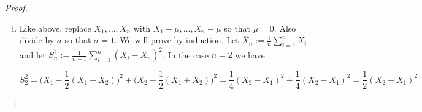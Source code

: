 \begin{proof}
\begin{enumerate}[(i)]
so 

\[
S^2 = \frac{1}{\sigma^2}  \left[  \frac{1}{\sqrt{2}} (X_1 - X_2) \right]^2  \sim \chi_1^2.
\]

\[
\frac{(n-1) S^2}{\sigma^2}  = \frac{1}{\sigma^2} \sum_{i=1}^n (X_i - \overline{X}_n)^2 = \frac{1}{\sigma^2} \sum_{i=1}^n \left( X_i - \overline{X}_n \right) ^2
\]

Next we will induct on \(n\). Some tedious algebra shows that 

\[
\frac{n S_{n+1}^2}{\sigma^2} = \frac{n-1}{\sigma^2} S_n^2 + \frac{1}{\sigma^2} \frac{n}{n+1} (X_{n+1} - \overline{X}_n)^2, \qquad \forall n \geq 2,
\]

where \(S_n^2\) is the sample variance for \(n\) independent Gaussian random variables. It can also be shown through simple algebra that

\[
\{  (X_{n+1} - \overline{X}_n) \} \sim \mathcal{N}(0, \sigma^2(n+1)/n),
\]

so

\[
\frac{1}{\sigma^2} \frac{n}{n+1} (X_{n+1} - \overline{X}_n)^2 \sim \chi_1^2.
\]

It can be shown by first principles (i.e., without Basu's Theorem) that \( \overline{X}_n \indep S_n^2\), and clearly \(X_{n+1} \indep S^2\). Therefore we have shown that if \((n-1) S_n^2 /\sigma^2 \sim \chi_{n-1}^2\), it follows that \(n S_{n+1}^2 /\sigma^2 \sim \chi_n^2\), concluding the proof that 

\[
\frac{(n-1) S^2}{\sigma^2} \sim \chi_{n-1}^2.
\]

To show that \(S^2\) is ancillary for \(\mu\), simply observe that 

\[
S^2 \sim  \frac{\sigma^2} {n-1} \chi_{n-1}^2;
\]

that is, the distribution of \(S^2\) depends only on \(n\) and \(\sigma^2\), not \(\mu\). Therefore by definition \(S^2\) is ancillary for \(\mu\).

\item Like above, replace \(X_1, \ldots, X_n\) with \(X_1 - \mu, \ldots, X_n - \mu\) so that \(\mu = 0\). Also divide by \(\sigma\) so that \(\sigma=1\). We will prove by induction. Let \(\overline{X}_n:= \frac{1}{n} \sum_{i=1}^n X_i\) and let \(S_n^2 := \frac{1}{n-1} \sum_{i=1}^n (X_i - \overline{X}_n)^2\). In the case \(n=2\) we have

\[
S_2^2 = \bigg(X_1 - \frac{1}{2}(X_1 + X_2) \bigg)^2 + \bigg(X_2 - \frac{1}{2}(X_1 + X_2) \bigg)^2 = \frac{1}{4}(X_2 - X_1)^2 + \frac{1}{4}(X_2 - X_1)^2 = \frac{1}{2}(X_2 - X_1)^2 
\]


\end{enumerate}
\end{proof}
